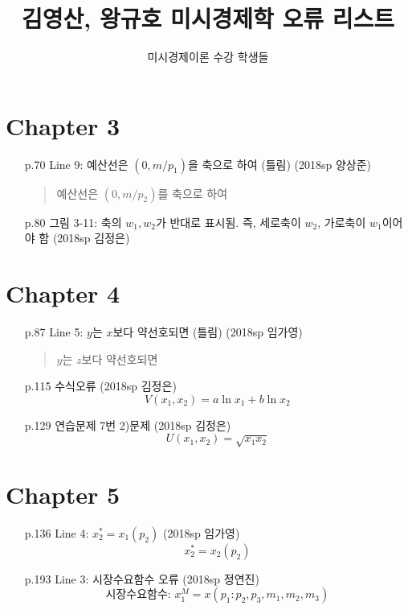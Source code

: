 \documentclass[a4paper,11pt]{article}
\author{미시경제이론 수강 학생들}
\title{김영산, 왕규호 미시경제학 오류 리스트}
\begin{document}
\maketitle

\section{Chapter 3} %
\label{sec:chapter_3}
\begin{itemize}
	\item [p.70] Line 9: 예산선은 $(0,m/p_1)$을 축으로 하여 (틀림) (2018sp 양상준)
	\begin{quote}
		예산선은 $(0,m/p_2)$를 축으로 하여
	\end{quote}
	\item [p.80] 그림 3-11: 축의 $w_1,w_2$가 반대로 표시됨. 즉, 세로축이 $w_2$, 가로축이 $w_1$이어야 함 (2018sp 김정은)
\end{itemize}

\section{Chapter 4} %

\label{sec:ch4}
\begin{itemize}
	\item [p.87] Line 5: $y$는 $x$보다 약선호되면 (틀림) (2018sp 임가영)
	\begin{quote}
		$y$는 $z$보다 약선호되면
	\end{quote}
	\item [p.115] 수식오류 (2018sp 김정은)
	\[
		V(x_1,x_2)=a \ln x_1 + b\ln x_2
	\]
	\item [p.129] 연습문제 7번 2)문제 (2018sp 김정은)
	\[
		U(x_1,x_2) = \sqrt{x_1x_2}
	\]
\end{itemize}

\section{Chapter 5} %
\label{sec:chapter_5}
\begin{itemize}
	\item [p.136] Line 4: $x_2^\ast=x_1(p_2) $ (2018sp 임가영)
	\[
		x_2^\ast=x_2(p_2)
	\]
	\item [p.193] Line 3: 시장수요함수 오류 (2018sp 정연진)
	\[
		\text{시장수요함수: } x_1^M = x(p_1:p_2,p_3,m_1,m_2,m_3)
	\]
\end{itemize}
\end{document}
